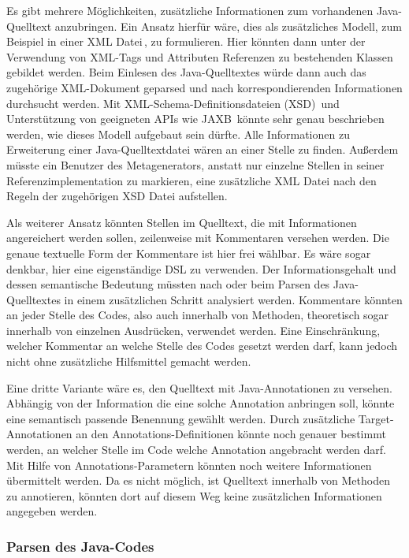 \documentclass[12pt,oneside,a4paper,parskip]{scrbook}
\begin{document}
Es gibt mehrere Möglichkeiten, zusätzliche Informationen zum vorhandenen Java-Quelltext anzubringen. Ein Ansatz hierfür wäre, dies als zusätzliches Modell, zum Beispiel in einer XML Datei\,\cite{xml2008}, zu formulieren. Hier könnten dann unter der Verwendung von XML-Tags und Attributen Referenzen zu bestehenden Klassen gebildet werden. Beim Einlesen des Java-Quelltextes würde dann auch das zugehörige XML-Dokument geparsed und nach korrespondierenden Informationen durchsucht werden. Mit XML-Schema-Definitionsdateien (XSD)\,\cite{xsd2012} und Unterstützung von geeigneten APIs wie JAXB\,\cite{jaxb} könnte sehr genau beschrieben werden, wie dieses Modell aufgebaut sein dürfte. Alle Informationen zu Erweiterung einer Java-Quelltextdatei wären an einer Stelle zu finden. Außerdem müsste ein Benutzer des Metagenerators, anstatt nur einzelne Stellen in seiner Referenzimplementation zu markieren, eine zusätzliche XML Datei nach den Regeln der zugehörigen XSD Datei aufstellen.

Als weiterer Ansatz könnten Stellen im Quelltext, die mit Informationen angereichert werden sollen, zeilenweise mit Kommentaren versehen werden. Die genaue textuelle Form der Kommentare ist hier frei wählbar. Es wäre sogar denkbar, hier eine eigenständige DSL zu verwenden. Der Informationsgehalt und dessen semantische Bedeutung müssten nach oder beim Parsen des Java-Quelltextes in einem zusätzlichen Schritt analysiert werden. Kommentare könnten an jeder Stelle des Codes, also auch innerhalb von Methoden, theoretisch sogar innerhalb von einzelnen Ausdrücken, verwendet werden. Eine Einschränkung, welcher Kommentar an welche Stelle des Codes gesetzt werden darf, kann jedoch nicht ohne zusätzliche Hilfsmittel gemacht werden.

Eine dritte Variante wäre es, den Quelltext mit Java-Annotationen zu versehen. Abhängig von der Information die eine solche Annotation anbringen soll, könnte eine semantisch passende Benennung gewählt werden. Durch zusätzliche Target-Annotationen an den Annotations-Definitionen könnte noch genauer bestimmt werden, an welcher Stelle im Code welche Annotation angebracht werden darf. Mit Hilfe von Annotations-Parametern könnten noch weitere Informationen übermittelt werden. Da es nicht möglich, ist Quelltext innerhalb von Methoden zu annotieren, könnten dort auf diesem Weg keine zusätzlichen Informationen angegeben werden.

\subsubsection{Parsen des Java-Codes}
\end{document}
